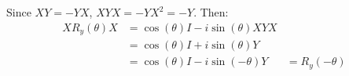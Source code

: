 \begingroup
\newcommand{\roto}[2]{R_{#1} \left( #2 \right)}
\newcommand{\coso}[1]{\cos \left( #1 \right)}
\newcommand{\sino}[1]{\sin \left( #1 \right)}
%
\par Since $XY = - YX$, $XYX = -YX^2 = -Y$.
%
Then:
%
\begin{align*}
X \roto{y}{\theta} X &= \coso{\theta} I - i \sino{\theta} XYX \\
&= \coso{\theta} I + i \sino{\theta} Y \\
&= \coso{\theta} I - i \sino{-\theta} Y
&= \roto{y}{-\theta}
\end{align*}
%
\endgroup
